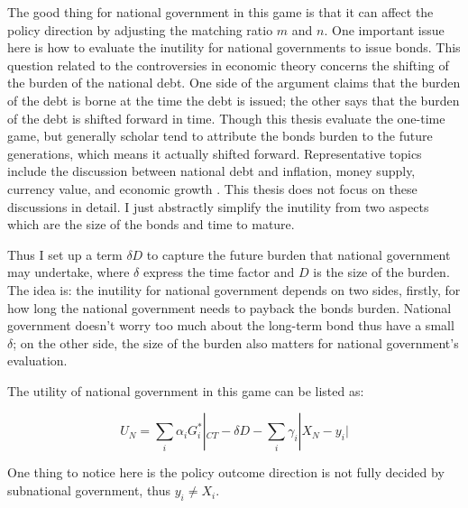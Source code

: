 \begin{itemize}
The good thing for national government in this game is that it can affect the policy direction by adjusting the matching ratio $m$ and $n$. One important issue here is how to evaluate the inutility for national governments to issue bonds. This question related to the controversies in economic theory concerns the shifting of the burden of the national debt. One side of the argument claims that the burden of the debt is borne at the time the debt is issued; the other says that the burden of the debt is shifted forward in time\cite{modigliani1961long,holcombe1981national}. Though this thesis evaluate the one-time game, but generally scholar tend to attribute the bonds burden to the future generations, which means it actually shifted forward. Representative topics include the discussion between national debt and inflation, money supply, currency value, and economic growth  \cite{cochrane2011inflation,aizenman2011using, hamburger1981deficits, panizza2014public, lucas1983optimal}. This thesis does not focus on these discussions in detail. I just abstractly simplify the inutility from two aspects which are the size of the bonds and time to mature\cite{diamond1965national, modigliani1961long, fullwiler2020interest}.

Thus I set up a term $\delta D$ to capture the future burden that national government may undertake, where $\delta$ express the time factor and $D$ is the size of the burden. The idea is: the inutility for national government depends on two sides, firstly, for how long the national government needs to payback the bonds burden. National government doesn't worry too much about the long-term bond thus have a small $\delta$; on the other side, the size of the burden also matters for national government's evaluation.

The utility of national government in this game can be listed as:

\begin{equation}
  U_N=\sum_i \alpha_iG_i^*|_{CT}-\delta D-\sum_i \gamma_i |X_N-y_i|
\end{equation}

One thing to notice here is the policy outcome direction is not fully decided by subnational government, thus $y_i\neq X_i$.


\end{itemize}

